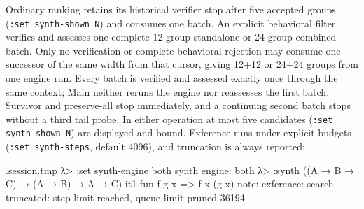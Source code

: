 \documentclass[11pt,oneside]{article}
\newcommand{\code}[1]{\texttt{#1}}
\newenvironment{session}
 {\VerbatimEnvironment\begin{VerbatimOut}{\jobname.session.tmp}}
 {\end{VerbatimOut}%
  \begin{sessionouter}%
  \VerbatimInput[fontsize=\footnotesize, breaklines=true,
    breaksymbolleft={\textcolor{stone}{\footnotesize$\hookrightarrow$}},
    formatcom=\color{ink}, tabsize=4]{\jobname.session.tmp}%
  \end{sessionouter}}
\begin{document}
Ordinary ranking retains its historical verifier stop after five accepted
groups (\code{:set synth-shown N}) and consumes one batch. An explicit behavioral filter verifies and
assesses one complete 12-group standalone or 24-group combined batch. Only no
verification or complete behavioral rejection may consume one successor of the
same width from that cursor, giving 12+12 or 24+24 groups from one engine run.
Every batch is verified and assessed exactly once through the same context;
Main neither reruns the engine nor reassesses the first batch. Survivor and
preserve-all stop immediately, and a continuing second batch stops without a
third tail probe. In either operation at most five candidates
(\code{:set synth-shown N}) are displayed and bound. Exference runs under
explicit budgets
(\code{:set synth-steps}, default 4096), and truncation is always
reported:

\begin{session}
λ> :set synth-engine both
synth engine: both
λ> :synth ((A → B → C) → (A → B) → A → C)
  it1  fun f g x => f x (g x)
note: exference: search truncated: step limit reached, queue limit pruned 36194
\end{session}
\end{document}

